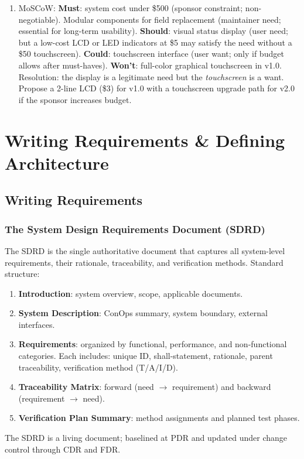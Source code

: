 \documentclass[11pt,letterpaper,twoside,openany]{book}
\begin{document}
\begin{enumerate}[leftmargin=1.5em]
\item MoSCoW: \textbf{Must}: system cost under \$500 (sponsor constraint; non-negotiable). Modular components for field replacement (maintainer need; essential for long-term usability). \textbf{Should}: visual status display (user need; but a low-cost LCD or LED indicators at \$5 may satisfy the need without a \$50 touchscreen). \textbf{Could}: touchscreen interface (user want; only if budget allows after must-haves). \textbf{Won't}: full-color graphical touchscreen in v1.0. Resolution: the display is a legitimate need but the \emph{touchscreen} is a want. Propose a 2-line LCD (\$3) for v1.0 with a touchscreen upgrade path for v2.0 if the sponsor increases budget.
\end{enumerate}

\chapter{Writing Requirements \& Defining Architecture}

\vspace{1em}


\vspace{1em}

\section{Writing Requirements}
\subsection{The System Design Requirements Document (SDRD)}
The SDRD is the single authoritative document that captures all system-level requirements, their rationale, traceability, and verification methods. Standard structure:
\begin{enumerate}[nosep,leftmargin=1.5em]
\item \textbf{Introduction}: system overview, scope, applicable documents.
\item \textbf{System Description}: ConOps summary, system boundary, external interfaces.
\item \textbf{Requirements}: organized by functional, performance, and non-functional categories. Each includes: unique ID, shall-statement, rationale, parent traceability, verification method (T/A/I/D).
\item \textbf{Traceability Matrix}: forward (need $\to$ requirement) and backward (requirement $\to$ need).
\item \textbf{Verification Plan Summary}: method assignments and planned test phases.
\end{enumerate}
The SDRD is a living document; baselined at PDR and updated under change control through CDR and FDR.
\end{document}
